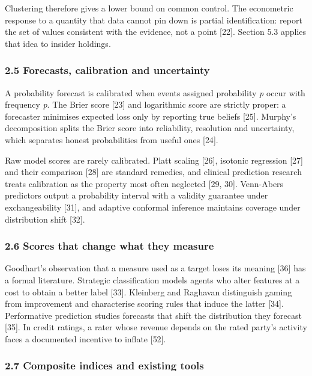Clustering therefore gives a lower bound on common control. The econometric response to a quantity that data cannot pin down is partial identification: report the set of values consistent with the evidence, not a point {[}22{]}. Section 5.3 applies that idea to insider holdings.

\subsubsection{2.5 Forecasts, calibration and uncertainty}\label{forecasts-calibration-and-uncertainty}

A probability forecast is calibrated when events assigned probability \emph{p} occur with frequency \emph{p}. The Brier score {[}23{]} and logarithmic score are strictly proper: a forecaster minimises expected loss only by reporting true beliefs {[}25{]}. Murphy's decomposition splits the Brier score into reliability, resolution and uncertainty, which separates honest probabilities from useful ones {[}24{]}.

Raw model scores are rarely calibrated. Platt scaling {[}26{]}, isotonic regression {[}27{]} and their comparison {[}28{]} are standard remedies, and clinical prediction research treats calibration as the property most often neglected {[}29, 30{]}. Venn-Abers predictors output a probability interval with a validity guarantee under exchangeability {[}31{]}, and adaptive conformal inference maintains coverage under distribution shift {[}32{]}.

\subsubsection{2.6 Scores that change what they measure}\label{scores-that-change-what-they-measure}

Goodhart's observation that a measure used as a target loses its meaning {[}36{]} has a formal literature. Strategic classification models agents who alter features at a cost to obtain a better label {[}33{]}. Kleinberg and Raghavan distinguish gaming from improvement and characterise scoring rules that induce the latter {[}34{]}. Performative prediction studies forecasts that shift the distribution they forecast {[}35{]}. In credit ratings, a rater whose revenue depends on the rated party's activity faces a documented incentive to inflate {[}52{]}.

\subsubsection{2.7 Composite indices and existing tools}\label{composite-indices-and-existing-tools}

